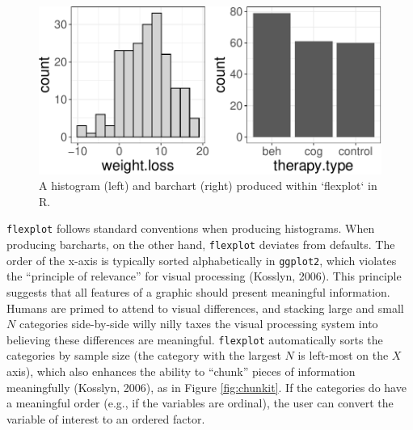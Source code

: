 \documentclass[
  man]{apa6}
\begin{document}
\begin{figure}

{\centering \includegraphics[width=0.9\linewidth]{flexplot_psychmeth_files/figure-latex/unnamed-chunk-3-1} 

}

\caption{A histogram (left) and barchart (right) produced within `flexplot` in R. }\label{fig:unnamed-chunk-3}
\end{figure}

\texttt{flexplot} follows standard conventions when producing histograms. When producing barcharts, on the other hand, \texttt{flexplot} deviates from defaults. The order of the x-axis is typically sorted alphabetically in \texttt{ggplot2}, which violates the \enquote{principle of relevance} for visual processing (Kosslyn, 2006). This principle suggests that all features of a graphic should present meaningful information. Humans are primed to attend to visual differences, and stacking large and small \(N\) categories side-by-side willy nilly taxes the visual processing system into believing these differences are meaningful. \texttt{flexplot} automatically sorts the categories by sample size (the category with the largest \(N\) is left-most on the \(X\) axis), which also enhances the ability to \enquote{chunk} pieces of information meaningfully (Kosslyn, 2006), as in Figure \ref{fig:chunkit}. If the categories do have a meaningful order (e.g., if the variables are ordinal), the user can convert the variable of interest to an ordered factor.
\end{document}
